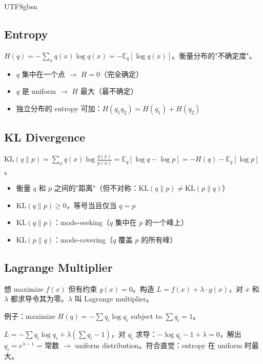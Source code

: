 \documentclass[11pt]{article}
\begin{document}
\begin{CJK}{UTF8}{gbsn}
\subsection*{Entropy}

$H(q) = -\sum_x q(x) \log q(x) = -\mathbb{E}_q[\log q(x)]$。衡量分布的"不确定度"。

\begin{itemize}[nosep]
  \item $q$ 集中在一个点 $\to$ $H = 0$（完全确定）
  \item $q$ 是 uniform $\to$ $H$ 最大（最不确定）
  \item 独立分布的 entropy 可加：$H(q_1 q_2) = H(q_1) + H(q_2)$
\end{itemize}

\subsection*{KL Divergence}

$\mathrm{KL}(q \| p) = \sum_x q(x) \log \frac{q(x)}{p(x)} = \mathbb{E}_q[\log q - \log p] = -H(q) - \mathbb{E}_q[\log p]$。

\begin{itemize}[nosep]
  \item 衡量 $q$ 和 $p$ 之间的"距离"（但不对称：$\mathrm{KL}(q\|p) \neq \mathrm{KL}(p\|q)$）
  \item $\mathrm{KL}(q\|p) \geq 0$，等号当且仅当 $q = p$
  \item $\mathrm{KL}(q\|p)$：mode-seeking（$q$ 集中在 $p$ 的一个峰上）
  \item $\mathrm{KL}(p\|q)$：mode-covering（$q$ 覆盖 $p$ 的所有峰）
\end{itemize}

\subsection*{Lagrange Multiplier}

想 maximize $f(x)$ 但有约束 $g(x) = 0$。构造 $L = f(x) + \lambda \cdot g(x)$，对 $x$ 和 $\lambda$ 都求导令其为零。$\lambda$ 叫 Lagrange multiplier。

例子：maximize $H(q) = -\sum q_i \log q_i$ subject to $\sum q_i = 1$。

$L = -\sum q_i \log q_i + \lambda(\sum q_i - 1)$，对 $q_i$ 求导：$-\log q_i - 1 + \lambda = 0$，解出 $q_i = e^{\lambda - 1}$ = 常数 $\to$ uniform distribution。符合直觉：entropy 在 uniform 时最大。

\newpage


\end{CJK}
\end{document}
